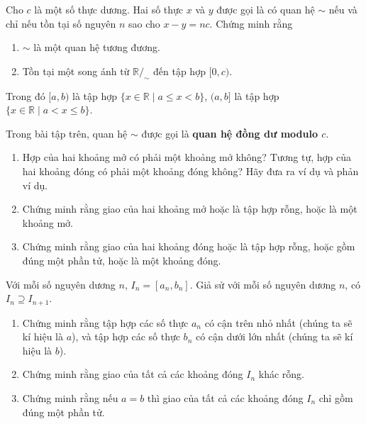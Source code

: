 \begin{exercise}
	Cho $c$ là một số thực dương. Hai số thực $x$ và $y$ được gọi là có quan hệ $\sim$ nếu và chỉ nếu tồn tại số nguyên $n$ sao cho $x - y = nc$. Chứng minh rằng
	\begin{enumerate}[label={(\roman*)}]
		\item $\sim$ là một quan hệ tương đương.
		\item Tồn tại một song ánh từ $\mathbb{R}/_{\sim}$ đến tập hợp $[0, c)$.
	\end{enumerate}

	Trong đó $[a, b)$ là tập hợp $\{ x\in\mathbb{R} \mid a\leq x < b \}$, $(a, b]$ là tập hợp $\{ x\in\mathbb{R} \mid a < x \leq b \}$.
\end{exercise}

Trong bài tập trên, quan hệ $\sim$ được gọi là \textbf{quan hệ đồng dư modulo $c$}.

\begin{exercise}
	\begin{enumerate}[label={(\roman*)}]
		\item Hợp của hai khoảng mở có phải một khoảng mở không? Tương tự, hợp của hai khoảng đóng có phải một khoảng đóng không? Hãy đưa ra ví dụ và phản ví dụ.
		\item Chứng minh rằng giao của hai khoảng mở hoặc là tập hợp rỗng, hoặc là một khoảng mở.
		\item Chứng minh rằng giao của hai khoảng đóng hoặc là tập hợp rỗng, hoặc gồm đúng một phần tử, hoặc là một khoảng đóng.
	\end{enumerate}
\end{exercise}

\begin{exercise}
	Với mỗi số nguyên dương $n$, $I_{n} = [a_{n}, b_{n}]$. Giả sử với mỗi số nguyên dương $n$, có $I_{n} \supseteq I_{n+1}$.
	\begin{enumerate}[label={(\roman*)}]
		\item Chứng minh rằng tập hợp các số thực $a_{n}$ có cận trên nhỏ nhất (chúng ta sẽ kí hiệu là $a$), và tập hợp các số thực $b_{n}$ có cận dưới lớn nhất (chúng ta sẽ kí hiệu là $b$).
		\item Chứng minh rằng giao của tất cả các khoảng đóng $I_{n}$ khác rỗng.
		\item Chứng minh rằng nếu $a = b$ thì giao của tất cả các khoảng đóng $I_{n}$ chỉ gồm đúng một phần tử.
	\end{enumerate}
\end{exercise}

